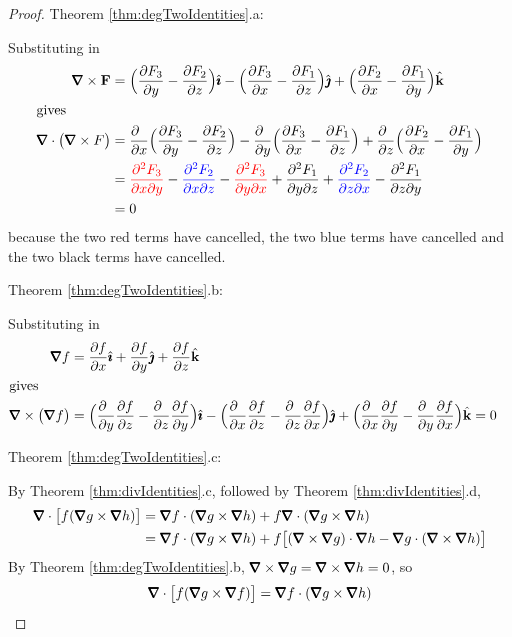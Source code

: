 \begin{proof}
\bigskip
\noindent Theorem \ref{thm:degTwoIdentities}.a:

Substituting in 
\begin{align*}
\vnabla\times\vF
&=\Big(\frac{\partial F_3}{\partial y}
-\frac{\partial F_2}{\partial z}\Big)\hi
-\Big(\frac{\partial F_3}{\partial x}
-\frac{\partial F_1}{\partial z}\Big)\hj
+\Big(\frac{\partial F_2}{\partial x}
-\frac{\partial F_1}{\partial y}\Big)\hk\\
\intertext{gives}
\vnabla\cdot\big(\vnabla\times F\big)
&=\frac{\partial\hfill}{\partial x}\Big(\frac{\partial F_3}{\partial y}
-\frac{\partial F_2}{\partial z}\Big)
-\frac{\partial\hfill}{\partial y}\Big(\frac{\partial F_3}{\partial x}
-\frac{\partial F_1}{\partial z}\Big)
+\frac{\partial\hfill}{\partial z}\Big(\frac{\partial F_2}{\partial x}
-\frac{\partial F_1}{\partial y}\Big)\cr
&=\textcolor{red}{\frac{\partial^2 F_3}{\partial x\partial y}}
-\textcolor{blue}{\frac{\partial^2 F_2}{\partial x\partial z}}
-\textcolor{red}{\frac{\partial^2 F_3}{\partial y\partial x}}
+\frac{\partial^2 F_1}{\partial y\partial z}
+\textcolor{blue}{\frac{\partial^2 F_2}{\partial z\partial x}}
-\frac{\partial^2 F_1}{\partial z\partial y} \\
&=0
\end{align*}
because the two red terms have cancelled, the two blue terms have
cancelled and the two black terms have cancelled.



\bigskip
\noindent Theorem \ref{thm:degTwoIdentities}.b:

 Substituting in 
\begin{align*}
\vnabla f
&=\frac{\partial f}{\partial x}\hi
+\frac{\partial f}{\partial y}\hj
+\frac{\partial f}{\partial z}\hk\cr
\intertext{gives}
\vnabla\times\big(\vnabla f\big)
&=\Big(\frac{\partial\hfill}{\partial y}\frac{\partial f}{\partial z}
-\frac{\partial\hfill}{\partial z}\frac{\partial f}{\partial y}\Big)
\hi
-\Big(\frac{\partial\hfill}{\partial x}\frac{\partial f}{\partial z}
-\frac{\partial\hfill}{\partial z}\frac{\partial f}{\partial x}\Big)
\hj
+\Big(\frac{\partial\hfill}{\partial x}\frac{\partial f}{\partial y}
-\frac{\partial\hfill}{\partial y}\frac{\partial f}{\partial x}\Big)
\hk
=0
\end{align*}


\bigskip
\noindent Theorem \ref{thm:degTwoIdentities}.c:


By Theorem \ref{thm:divIdentities}.c, followed by 
Theorem \ref{thm:divIdentities}.d,
\begin{align*}
\vnabla\cdot\big[f(\vnabla g\times\vnabla h)\big]
&=\vnabla f\cdot(\vnabla g\times\vnabla h)
+f\vnabla\cdot(\vnabla g\times\vnabla h) \\
&=\vnabla f\cdot(\vnabla g\times\vnabla h)
+f\big[(\vnabla\times\vnabla g)\cdot\vnabla h-\vnabla g\cdot(\vnabla\times\vnabla h)\big]
\end{align*}
By Theorem \ref{thm:degTwoIdentities}.b, 
$\vnabla\times\vnabla g=\vnabla\times\vnabla h=0$, so 
\begin{equation*}
\vnabla\cdot\big[f(\vnabla g\times\vnabla f)\big]
               =\vnabla f\cdot(\vnabla g\times\vnabla h)
\end{equation*}


\end{proof}
